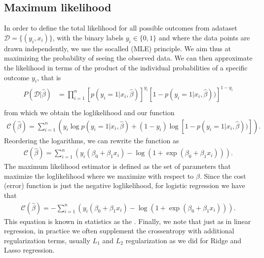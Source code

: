 \documentclass[letterpaper,10pt,english]{sphinxmanual}
\begin{document}
\subsection{Maximum likelihood}
\label{\detokenize{chapter5:maximum-likelihood}}
In order to define the total likelihood for all possible outcomes from adataset \(\mathcal{D}=\{(y_i,x_i)\}\), with the binary labels
\(y_i\in\{0,1\}\) and where the data points are drawn independently, we use the so\sphinxhyphen{}called  (MLE) principle.
We aim thus at maximizing
the probability of seeing the observed data. We can then approximate the
likelihood in terms of the product of the individual probabilities of a specific outcome \(y_i\), that is
\begin{equation*}
\begin{split}
\begin{align*}
P(\mathcal{D}|\hat{\beta})& = \prod_{i=1}^n \left[p(y_i=1|x_i,\hat{\beta})\right]^{y_i}\left[1-p(y_i=1|x_i,\hat{\beta}))\right]^{1-y_i}\nonumber \\
\end{align*}
\end{split}
\end{equation*}
from which we obtain the log\sphinxhyphen{}likelihood and our  function
\begin{equation*}
\begin{split}
\mathcal{C}(\hat{\beta}) = \sum_{i=1}^n \left( y_i\log{p(y_i=1|x_i,\hat{\beta})} + (1-y_i)\log\left[1-p(y_i=1|x_i,\hat{\beta}))\right]\right).
\end{split}
\end{equation*}
Reordering the logarithms, we can rewrite the  function as
\begin{equation*}
\begin{split}
\mathcal{C}(\hat{\beta}) = \sum_{i=1}^n  \left(y_i(\beta_0+\beta_1x_i) -\log{(1+\exp{(\beta_0+\beta_1x_i)})}\right).
\end{split}
\end{equation*}
The maximum likelihood estimator is defined as the set of parameters that maximize the log\sphinxhyphen{}likelihood where we maximize with respect to \(\beta\).
Since the cost (error) function is just the negative log\sphinxhyphen{}likelihood, for logistic regression we have that
\begin{equation*}
\begin{split}
\mathcal{C}(\hat{\beta})=-\sum_{i=1}^n  \left(y_i(\beta_0+\beta_1x_i) -\log{(1+\exp{(\beta_0+\beta_1x_i)})}\right).
\end{split}
\end{equation*}
This equation is known in statistics as the . Finally, we note that just as in linear regression,
in practice we often supplement the cross\sphinxhyphen{}entropy with additional regularization terms, usually \(L_1\) and \(L_2\) regularization as we did for Ridge and Lasso regression.
\end{document}
